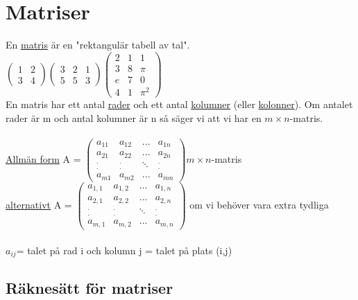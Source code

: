 \documentclass{article}
\begin{document}
    \section{Matriser}
    En \underline{matris} är en "rektangulär tabell av tal".\\
    $\begin{pmatrix} 
        1 & 2\\ 
        3 & 4 
    \end{pmatrix}
    \begin{pmatrix} 
        3 & 2 & 1\\ 
        5 & 5 & 3 
    \end{pmatrix}
    \begin{pmatrix}
        2 & 1 & 1\\
        3 & 8 & \pi\\
        e & 7 & 0\\
        4 & 1 & \pi^{2}
    \end{pmatrix}$\\
    En matris har ett antal \underline{rader} och ett antal \underline{kolumner} (eller \underline{kolonner}).
    Om antalet rader är m och antal kolumner är n så säger vi att vi har en $m\times n$-matris.\\\\
    \underline{Allmän form} A = $ \begin{pmatrix}
        a_{11} & a_{12} & ... & a_{1n}\\
        a_{21} & a_{22} & ... & a_{2n}\\
        ^{.}_{.} & ^{.}_{.} & \ddots & ^{.}_{.}\\
        a_{m1} & a_{m2} & ... & a_{mn}
    \end{pmatrix} m\times n$-matris\\
    \underline{alternativt} A = $ \begin{pmatrix}
        a_{1,1} & a_{1,2} & ... & a_{1,n}\\
        a_{2,1} & a_{2,2} & ... & a_{2,n}\\
        ^{.}_{.} & ^{.}_{.} & \ddots & ^{.}_{.}\\
        a_{m,1} & a_{m,2} & ... & a_{m,n}
    \end{pmatrix}$ om vi behöver vara extra tydliga\\\\
    $a_{ij}$= talet på rad i och kolumn j = talet på plats (i,j)
    \subsection{Räknesätt för matriser}
\end{document}
